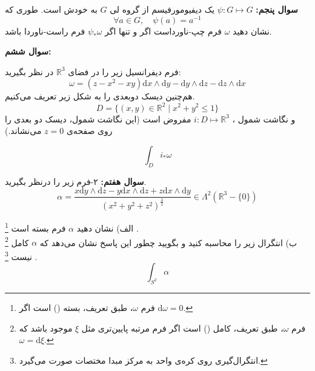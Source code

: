 \documentclass{article}
\begin{document}
	
	\vspace{-2em}
	\endline
	
	\newpage
	\vspace{-2em}
	\textbf{سوال پنجم:}
		$\psi: G \mapsto G$
		  یک دیفیومورفیسم از گروه لی $G$ به خودش است. طوری که 
		  \[
		  \forall a \in G, \quad \psi(a) = a^{-1}
		  \]
		  نشان دهید $\omega$ فرم چپ-‌ناورداست اگر و تنها اگر 
		  $\psi_*\omega$ فرم راست-‌ناوردا باشد.
	
	\vspace{-2em}
	\endline
	
	
	\noindent
	\textbf{سوال ششم: }
	
	\noindent
	فرم دیفرانسیل زیر را در فضای 
	$\mathbb{R}^3$
	 در نظر بگیرید:
	\begin{equation*}
		\omega = (z-x^2-xy) \text{d}x\wedge\text{d}y - \text{d}y\wedge\text{d}z - \text{d}z\wedge\text{d}x
	\end{equation*}
	هم‌چنین دیسک دوبعدی را به شکل زیر تعریف می‌کنیم.
	\begin{equation*}
		D = \{(x,y) \in \mathbb{R}^2 \;|\; x^2 + y^2 \leq 1\} 
	\end{equation*}
	و نگاشت شمول
	،
	$i:D\longmapsto \mathbb{R}^3$
	مفروض است (این نگاشت شمول، دیسک دو بعدی را روی صفحه‌ی 
	$z=0$
	می‌نشاند.)
	
	\begin{equation*}
		\int_{D}^{} i_*\omega
	\end{equation*}
	
	\vspace{-2em}
	\endline
	
	\textbf{سوال هفتم:}
	۲-فرم زیر را درنظر بگیرید.
		\begin{equation*}
		\alpha = \frac{x\text{d}y\wedge\text{d}z - y\text{d}x\wedge\text{d}z + z\text{d}x\wedge\text{d}y}{(x^2 + y^2 + z^2)^\frac32} \in \Lambda^2(\mathbb{R}^3 - \{0\})
\end{equation*}

الف) نشان دهید $\alpha$ فرم بسته است
	\footnote{فرم 
	$\omega$، طبق تعریف، 
	بسته () است اگر 
	$\text{d}\omega = 0$.
	}
	.\\
ب) انتگرال زیر را محاسبه کنید و بگویید چطور این پاسخ نشان می‌دهد که $\alpha$ کامل
	\footnote{فرم 
		$\omega$، طبق تعریف، 
		کامل () است اگر فرم مرتبه پایین‌تری مثل 
		$\xi$
		موجود باشد که  
		$\omega = \text{d}\xi$.
	}
	 نیست
	 \footnote{انتگرال‌گیری روی کره‌ی واحد به مرکز مبدا مختصات صورت می‌گیرد.}
	 .
\begin{equation*}
	\int_{S^2}^{} \alpha
\end{equation*}
\end{document}
